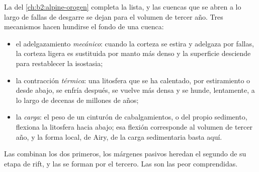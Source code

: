 La  del \cref{ch:b2:alpine-orogen} completa la lista, y las cuencas que se abren
a lo largo de fallas de desgarre se dejan para el volumen de tercer año. Tres mecanismos hacen hundirse el fondo de una
cuenca:
\begin{itemize}
  \item el adelgazamiento \emph{mecánico}: cuando la corteza se estira y adelgaza por fallas, la corteza
        ligera es sustituida por manto más denso y la superficie desciende para restablecer la isostasia;
  \item la contracción \emph{térmica}: una litosfera que se ha calentado, por estiramiento o desde
        abajo, se enfría después, se vuelve más densa y se hunde, lentamente, a lo largo de decenas de millones de años;
  \item la \emph{carga}: el peso de un cinturón de cabalgamientos, o del propio sedimento, flexiona la
        litosfera hacia abajo; esa flexión corresponde al volumen de tercer año, y la forma local, de Airy, de
        la carga sedimentaria basta aquí.
\end{itemize}
Las  combinan los dos primeros, los márgenes pasivos heredan el segundo de su etapa de rift, y
las  se forman por el tercero. Las  son las peor comprendidas.

